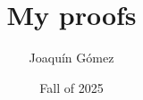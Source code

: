 \documentclass[a4paper, 12pt]{article}
\title{My proofs}
\author{Joaquín Gómez}
\date{Fall of 2025}
\begin{document}
\maketitle
\pagebreak


\end{document}
